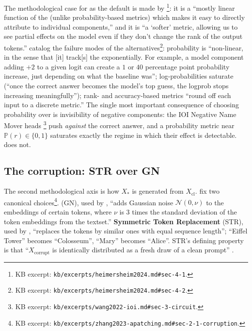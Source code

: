 The methodological case for  as the default is made by
\citet[\S 4.1]{heimersheim2024-apatching-howto}\footnote{KB excerpt:
\nolinkurl{kb/excerpts/heimersheim2024.md#sec-4-1}.}: it is a
``mostly linear function of the  (unlike
probability-based metrics) which makes it easy to directly attribute
 to individual components,'' and it is ``a `softer'
metric, allowing us to see partial effects on the model even if they
don't change the rank of the output tokens.''
\citet[\S 4.2]{heimersheim2024-apatching-howto} catalog the failure
modes of the alternatives\footnote{KB excerpt:
\nolinkurl{kb/excerpts/heimersheim2024.md#sec-4-2}.}: probability is
``non-linear, in the sense that [it] track[s] the  exponentially.
For example, a model component adding $+2$ to a given logit can create
a $1$ or $40$ percentage point probability increase, just depending on
what the baseline was''; log-probabilities saturate (``once the correct
answer becomes the model's top guess, the logprob stops increasing
meaningfully''); rank- and accuracy-based metrics ``round off each
input to a discrete metric.'' The single most important consequence of
choosing probability over  is invisibility of negative
components: the IOI Negative Name Mover heads
\citep[\S 3]{wang2022-ioi}\footnote{KB excerpt:
\nolinkurl{kb/excerpts/wang2022-ioi.md#sec-3-circuit}.} push \emph{against}
the correct answer, and a probability metric near $\mathbb{P}(r) \in
\{0, 1\}$ saturates exactly the regime in which their effect is
detectable.  does not.

\subsection{The corruption: STR over GN}
\label{sec:patching-corruption}

The second methodological axis is how $X_{*}$ is generated from
$X_{\text{cl}}$. \citet[\S 2.1]{zhang2023-apatching} fix two
canonical choices\footnote{KB excerpt:
\nolinkurl{kb/excerpts/zhang2023-apatching.md#sec-2-1-corruption}.}.
\textbf{} (GN), used by \citet{meng2022-rome}, ``adds
Gaussian noise $\mathcal{N}(0, \nu)$ to the embeddings of certain 
tokens, where $\nu$ is 3 times the standard deviation of the token
embeddings from the textset.'' \textbf{Symmetric Token Replacement}
(STR), used by \citet{wang2022-ioi}, ``replaces the  tokens by
similar ones with equal sequence length''; ``Eiffel Tower'' becomes
``Colosseum'', ``Mary'' becomes ``Alice''. STR's defining property is
that ``$X_{\mathrm{corrupt}}$ is identically distributed as a fresh
draw of a clean prompt'' \citep[\S 2.1]{zhang2023-apatching}.

